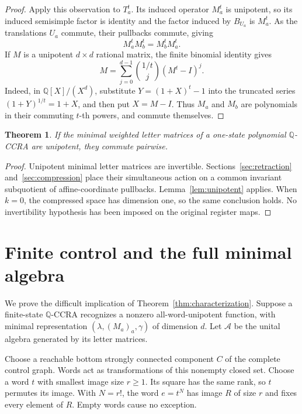 \documentclass[acmlarge,screen,11pt,nonacm]{acmart}
\newcommand{\Q}{\mathbb{Q}}
\newtheorem{theorem}{Theorem}
\theoremstyle{definition}
\begin{document}
\begin{proof}
Apply this observation to $T_a^t$. Its induced operator $M_a^t$ is unipotent, so its induced semisimple factor is identity and the factor induced by $B_{U_a}$ is $M_a^t$. As the translations $U_a$ commute, their pullbacks commute, giving
\[
 M_a^tM_b^t=M_b^tM_a^t.
\]
If $M$ is a unipotent $d\times d$ rational matrix, the finite binomial identity gives
\begin{equation}\label{eq:root}
 M=\sum_{j=0}^{d-1}\binom{1/t}{j}(M^t-I)^j.
\end{equation}
Indeed, in $\Q[X]/(X^d)$, substitute $Y=(1+X)^t-1$ into the truncated series $(1+Y)^{1/t}=1+X$, and then put $X=M-I$. Thus $M_a$ and $M_b$ are polynomials in their commuting $t$-th powers, and commute themselves.
\end{proof}

\begin{theorem}\label{thm:obstruction}
If the minimal weighted letter matrices of a one-state polynomial $\Q$-CCRA are unipotent, they commute pairwise.
\end{theorem}
\begin{proof}
Unipotent minimal letter matrices are invertible. Sections~\ref{sec:retraction} and~\ref{sec:compression} place their simultaneous action on a common invariant subquotient of affine-coordinate pullbacks. Lemma~\ref{lem:unipotent} applies. When $k=0$, the compressed space has dimension one, so the same conclusion holds. No invertibility hypothesis has been imposed on the original register maps.
\end{proof}


\section{Finite control and the full minimal algebra}\label{sec:control}
We prove the difficult implication of Theorem~\ref{thm:characterization}. Suppose a finite-state $\Q$-CCRA recognizes a nonzero all-word-unipotent function, with minimal representation $(\lambda,(M_a)_a,\gamma)$ of dimension $d$. Let $\mathcal A$ be the unital algebra generated by its letter matrices.

Choose a reachable bottom strongly connected component $C$ of the complete control graph. Words act as transformations of this nonempty closed set. Choose a word $t$ with smallest image size $r\geq1$. Its square has the same rank, so $t$ permutes its image. With $N=r!$, the word $e=t^N$ has image $R$ of size $r$ and fixes every element of $R$. Empty words cause no exception.
\end{document}
